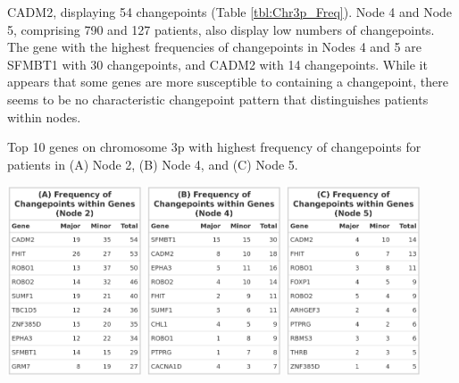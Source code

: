 \noindent CADM2, displaying 54 changepoints (Table \ref{tbl:Chr3p_Freq}). Node 4 and Node 5, comprising 790 and 127 patients, also display low numbers of changepoints. The gene with the highest frequencies of changepoints in Nodes 4 and 5 are SFMBT1 with 30 changepoints, and CADM2 with 14 changepoints. While it appears that some genes are more susceptible to containing a changepoint, there seems to be no characteristic changepoint pattern that distinguishes patients within nodes.

\begin{table}[!htb]
\caption[Top 10 genes on chromosome 3p with highest frequency of changepoints for patients in Nodes 2, 4 and 5.]{Top 10 genes on chromosome 3p with highest frequency of changepoints for patients in (A) Node 2, (B) Node 4, and (C) Node 5.}

\centering
\includegraphics[width = 0.3\textwidth]{../tables/Chapter_6/Chr3_Node_2.png}
\includegraphics[width = 0.3\textwidth]{../tables/Chapter_6/Chr3_Node_4.png}
\includegraphics[width = 0.3\textwidth]{../tables/Chapter_6/Chr3_Node_5.png}
\vspace{1cm}
\label{tbl:Chr3p_Freq}
\end{table}

